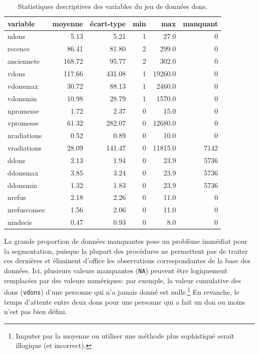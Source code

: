 \documentclass[
  11pt,
  letterpaper,
]{scrbook}
\theoremstyle{definition}
\theoremstyle{remark}
\begin{document}
\hypertarget{tbl-statdescriptdons}{}
\begin{table}
\caption{\label{tbl-statdescriptdons}Statistiques descriptives des variables du jeu de données dons. }\tabularnewline

\centering
\begin{tabular}{lrrrrr}
\toprule
variable & moyenne & écart-type & min & max & manquant\\
\midrule
ndons & 5.13 & 5.21 & 1 & 27.0 & 0\\
recence & 86.41 & 81.80 & 2 & 299.0 & 0\\
anciennete & 168.72 & 95.77 & 2 & 302.0 & 0\\
vdons & 117.66 & 431.08 & 1 & 19260.0 & 0\\
vdonsmax & 30.72 & 88.13 & 1 & 2460.0 & 0\\
\addlinespace
vdonsmin & 10.98 & 28.79 & 1 & 1570.0 & 0\\
npromesse & 1.72 & 2.37 & 0 & 15.0 & 0\\
vpromesse & 61.32 & 282.07 & 0 & 12680.0 & 0\\
nradiations & 0.52 & 0.89 & 0 & 10.0 & 0\\
vradiations & 28.09 & 141.47 & 0 & 11815.0 & 7142\\
\addlinespace
ddons & 2.13 & 1.94 & 0 & 23.9 & 5736\\
ddonsmax & 3.85 & 3.24 & 0 & 23.9 & 5736\\
ddonsmin & 1.32 & 1.83 & 0 & 23.9 & 5736\\
nrefus & 2.18 & 2.26 & 0 & 11.0 & 0\\
nrefusconsec & 1.56 & 2.06 & 0 & 11.0 & 0\\
\addlinespace
nindecis & 0.47 & 0.93 & 0 & 8.0 & 0\\
\bottomrule
\end{tabular}
\end{table}

La grande proportion de données manquantes pose un problème immédiat
pour la segmentation, puisque la plupart des procédures ne permettent
pas de traiter ces dernières et éliminent d'office les observations
correspondantes de la base des données. Ici, plusieurs valeurs
manquantes (\texttt{NA}) peuvent être logiquement remplacées par des
valeurs numériques: par exemple, la valeur cumulative des dons
(\texttt{vdons}) d'une personne qui n'a jamais donné est
nulle.\footnote{Imputer par la moyenne ou utiliser une méthode plus
  sophistiqué serait illogique (et incorrect).} En revanche, le temps
d'attente entre deux dons pour une personne qui a fait un don ou moins
n'est pas bien défini.
\end{document}

